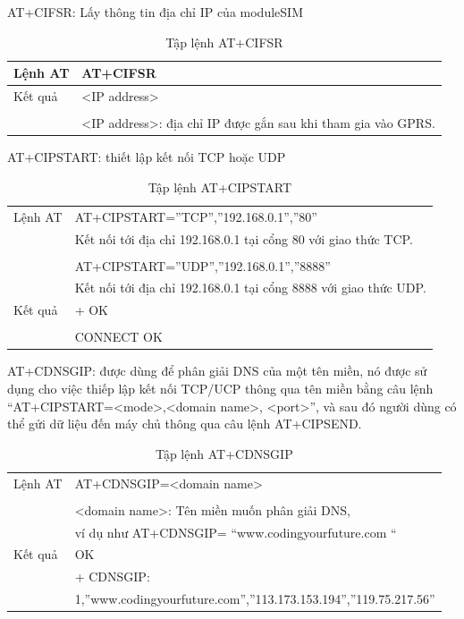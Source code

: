 AT+CIFSR: Lấy thông tin địa chỉ IP của moduleSIM
\begin{table}[htp]
\label{table:AT+CIFS}
\begin{tabular}{|l|l|}
\hline
Lệnh AT & AT+CIFSR \\ \hline
Kết quả  & 
<IP address> \\
& \\
& <IP address>: địa chỉ IP được gắn sau khi tham gia vào GPRS.\\\hline
\end{tabular}

\caption[Tập lệnh AT+CIFSR: lấy thông tin địa chỉ IP của moduleSIM]{Tập lệnh AT+CIFSR}
\end{table}




AT+CIPSTART: thiết lập kết nối TCP hoặc UDP
\begin{table}[htp]
\label{table:AT+CIPSTART}
\begin{tabular}{|l|l|}
\hline
Lệnh AT & AT+CIPSTART=”TCP”,”192.168.0.1”,”80” \\ 
& Kết nối tới địa chỉ 192.168.0.1 tại cổng 80 với giao thức TCP.\\
& \\
& AT+CIPSTART=”UDP”,”192.168.0.1”,”8888” \\ 
& Kết nối tới địa chỉ 192.168.0.1 tại cổng 8888 với giao thức UDP.\\ \hline
Kết quả  &+ OK \\
& \\
& CONNECT OK\\\hline
\end{tabular}

\caption[Tập lệnh AT+CIPSTART: thiết lập kết nối TCP hoặc UDP]{Tập lệnh AT+CIPSTART}
\end{table}


AT+CDNSGIP: được dùng để phân giải DNS của một tên miền, nó được sử dụng cho việc thiếp lập kết nối TCP/UCP thông qua tên miền bằng câu lệnh “AT+CIPSTART=<mode>,<domain name>, <port>”, và sau đó người dùng có thể gửi dữ liệu đến máy chủ thông qua câu lệnh AT+CIPSEND.
\begin{table}[htp]
\label{table:AT+CDNSGIP}
\begin{tabular}{|l|l|}
\hline
Lệnh AT & AT+CDNSGIP=<domain name> \\ 
& \\
& <domain name>: Tên miền muốn phân giải DNS, \\

& ví dụ như AT+CDNSGIP= “www.codingyourfuture.com “\\ \hline
Kết quả  &OK \\
&+ CDNSGIP:\\
&1,”www.codingyourfuture.com”,”113.173.153.194”,”119.75.217.56”\\\hline
\end{tabular}

\caption[Tập lệnh AT+CDNSGIP: phân giải DNS tên miền]{Tập lệnh AT+CDNSGIP}
\end{table}












